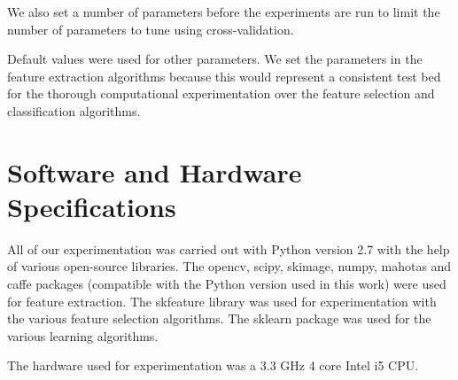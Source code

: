 We also set a number of parameters before the experiments are run to limit the number of parameters to tune using cross-validation. 


%


Default values were used for other parameters. We set the parameters in the feature extraction algorithms because this would represent a consistent test bed for the thorough computational experimentation over the feature selection and classification algorithms.

\section{Software and Hardware Specifications}
All of our experimentation was carried out with Python version 2.7 with the help  of various open-source libraries. The opencv, scipy, skimage, numpy, mahotas and caffe packages (compatible with the Python version used in this work) were used for feature extraction. The skfeature library was used for experimentation with the various feature selection algorithms. The sklearn package was used for the various learning algorithms.

The hardware used for experimentation was a 3.3 GHz 4 core Intel i5 CPU.
